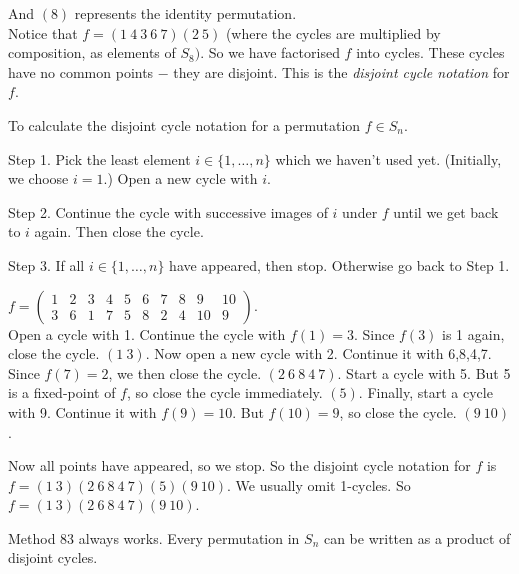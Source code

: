 \documentclass[10pt]{scrartcl}
\begin{document}
And $(8)$ represents the identity permutation.\\


Notice that $f =  (1~4~3~6~7)(2~5)$ (where the cycles are multiplied by composition, as elements of $S_8)$. So we have factorised $f$ into cycles. These cycles have no common points $-$ they are disjoint. This is the \emph{disjoint cycle notation} for $f$.\\


\begin{method}To calculate the disjoint cycle notation for a permutation $f \in S_n$.

Step 1. Pick the least element $i \in \{1,\dots,n\}$ which  we haven't used yet. (Initially, we choose $i=1$.) Open a new cycle with $i$. 

Step 2. Continue the cycle with successive images of $i$ under $f$ until we get back to $i$ again. Then close the cycle.

Step 3. If all $i \in \{1,\dots,n\}$ have appeared, then stop. Otherwise go back to Step 1.

\end{method}\vspace*{10pt}

\begin{examples}$f = \begin{pmatrix}
1 & 2 & 3 & 4 & 5 & 6 & 7 & 8 & 9 & 10\\
3 & 6 & 1 & 7 & 5 & 8 & 2 & 4 & 10 & 9	
\end{pmatrix}$. \\

Open a cycle with 1. Continue the cycle with $f(1) = 3$. Since $f(3)$ is 1 again, close the cycle. $(1~3)$. Now open a new cycle with 2. Continue it with 6,8,4,7. Since $f(7) = 2$, we then close the cycle. $(2~6~8~4~7)$. Start a cycle with 5. But 5 is a fixed-point of $f$, so close the cycle immediately. $(5)$. Finally, start a cycle with 9. Continue it with $f(9) = 10$. But $f(10) = 9$, so close the cycle. $(9~10)$.

Now all points have appeared, so we stop. So the disjoint cycle notation for $f$ is $f = (1~3)(2~6~8~4~7)(5)(9~10)$. We usually omit 1-cycles. So $f = (1~3)(2~6~8~4~7)(9~10)$.
\end{examples}\vspace*{5pt}

\begin{proposition} Method 83 always works. Every permutation in $S_n$ can be written as a product of disjoint cycles.	
\end{proposition}
\end{document}
